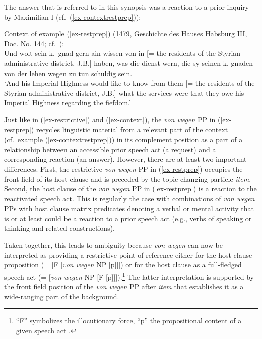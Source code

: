 \documentclass[output=paper
  ,nobabel
  ,draftmode
  ,babelshorthands
  ,colorlinks, citecolor=brown
]{langscibook}
\begin{document}
\noindent
The answer that is referred to in this synopsis was a reaction to a prior inquiry by Maximilian I (cf.\ (\ref{ex-contextrestprep})):

\eanoraggedright\label{ex-contextrestprep} Context of example (\ref{ex-restprep})
(1479, Geschichte des Hauses Habsburg III, Doc. No. 144; cf.\ \citealp[330]{Chmel1858}):\\[2pt]
Und wolt sein k.\ gnad gern ain wissen von in [= the residents of the Styrian administrative district, J.B.] haben, was die dienst wern, die sy seinen k. gnaden von der lehen wegen zu tun schuldig sein.\\
	`And his Imperial Highness would like to know from them [= the residents of the Styrian administrative district, J.B.] what the services were that they owe his Imperial Highness regarding the fiefdom.'
\z

\noindent
Just like in (\ref{ex-restrictive}) and (\ref{ex-context}), the \emph{von wegen} PP in
(\ref{ex-restprep}) recycles linguistic material from a relevant part of the context (cf.\ example
(\ref{ex-contextrestprep})) in its complement position as a part of a relationship between an
accessible prior speech act (a request) and a corresponding reaction (an answer). However, there are
at least two important differences. First, the restrictive \emph{von wegen} PP in
(\ref{ex-restprep}) occupies the front field of its host clause and is preceded by the topic-changing  particle \emph{item}. Second, the host clause of the \emph{von wegen} PP in  (\ref{ex-restprep}) is a reaction to the reactivated speech act. This is regularly the case with combinations of \emph{von wegen} PPs with host clause matrix predicates denoting a verbal or mental activity that is or at least could be a reaction to a prior speech act (e.g., verbs of speaking or thinking and related constructions).

Taken together, this leads to ambiguity because \emph{von wegen} can now be interpreted as providing a restrictive point of reference either for the host clause proposition (= [F [\emph{von wegen} NP [p]]]) or for the host clause as a full-fledged speech act (= [\emph{von wegen} NP [F [p]]]).\footnote{``F'' symbolizes the illocutionary force, ``p'' the propositional content of a given speech act \citep[cf.][31]{Searle1969}.} The latter interpretation is supported by the front field position of the \emph{von wegen} PP after \emph{item} that establishes it as a wide-ranging part of the background.
\end{document}
